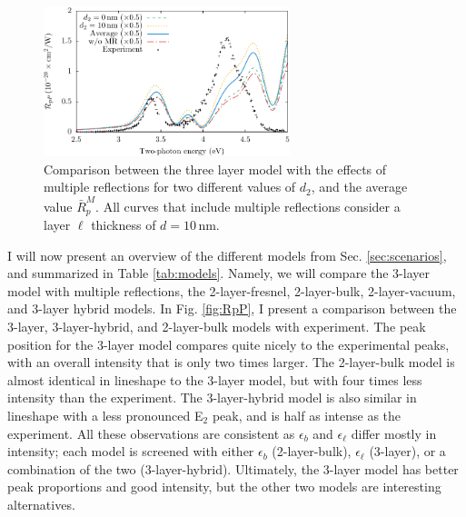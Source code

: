 \begin{figure}[b]
\centering
\includegraphics[width=0.64\textwidth]{content/figures/fig-Si1x1-MRdepth}
\caption[Different depths for the placement of the polarization sheet in the
thin layer $\ell$.]
{Comparison between the three layer model with the effects of multiple
reflections for two different values of $d_{2}$, and the average value
$\bar{R}^{M}_{p}$. All curves that include multiple reflections consider a layer
$\ell$ thickness of $d = 10\,\mathrm{nm}$.}
\label{fig:d2values}
\end{figure}

I will now present an overview of the different models from Sec.
\ref{sec:scenarios}, and summarized in Table \ref{tab:models}. Namely, we will
compare the 3-layer model with multiple reflections, the 2-layer-fresnel,
2-layer-bulk, 2-layer-vacuum, and 3-layer hybrid models. In Fig. \ref{fig:RpP},
I present a comparison between the 3-layer, 3-layer-hybrid, and 2-layer-bulk
models with experiment. The peak position for the 3-layer model compares quite
nicely to the experimental peaks, with an overall intensity that is only two
times larger. The 2-layer-bulk model is almost identical in lineshape to the
3-layer model, but with four times less intensity than the experiment. The
3-layer-hybrid model is also similar in lineshape with a less pronounced E$_{2}$
peak, and is half as intense as the experiment. All these observations are
consistent as $\epsilon_{b}$ and $\epsilon_{\ell}$ differ mostly in intensity;
each model is screened with either $\epsilon_{b}$ (2-layer-bulk),
$\epsilon_{\ell}$ (3-layer), or a combination of the two (3-layer-hybrid).
Ultimately, the 3-layer model has better peak proportions and good intensity,
but the other two models are interesting alternatives.


